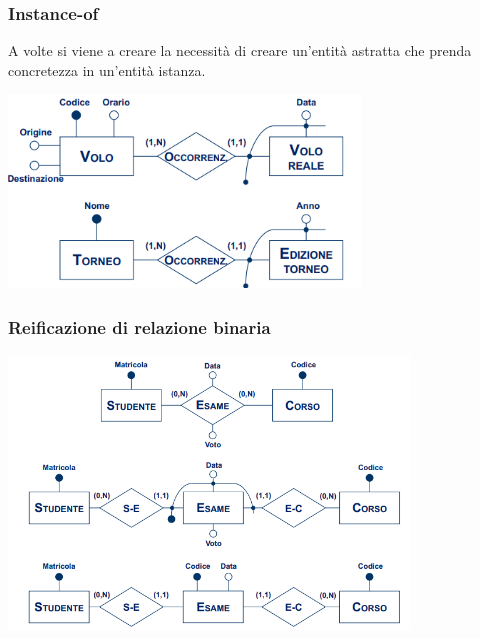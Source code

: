 \documentclass[12pt]{article}
\begin{document}
\subsubsection{Instance-of}
A volte si viene a creare la necessità di creare un'entità astratta che prenda concretezza in un'entità istanza.
\begin{center}
    \includegraphics[width = 0.70\textwidth]{Images/47.PNG}
\end{center}
\subsubsection{Reificazione di relazione binaria}
\begin{center}
    \includegraphics[width = 0.80\textwidth]{Images/48.PNG}
\end{center}
\end{document}
